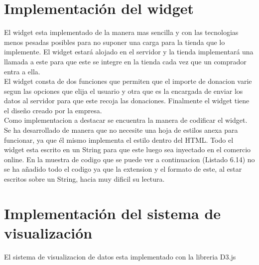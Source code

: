
\section{Implementación del widget}
El widget esta implementado de la manera mas sencilla y con las tecnologias menos pesadas posibles para no suponer una carga para la tienda que lo implemente. El widget estará alojado en el servidor y la tienda implementará una llamada a este para que este se integre en la tienda cada vez que un comprador entra a ella.\\

El widget consta de dos funciones que permiten que el importe de donacion varie segun las opciones que elija el usuario y otra que es la encargada de enviar los datos al servidor para que este recoja las donaciones. Finalmente el widget tiene el diseño creado por la empresa.\\

Como implementacion a destacar se encuentra la manera de codificar el widget. Se ha desarrollado de manera que no necesite una hoja de estilos anexa para funcionar, ya que él mismo implementa el estilo dentro del HTML. Todo el widget esta escrito en un String para que este luego sea inyectado en el comercio online. En la muestra de codigo que se puede ver a continuacion (Listado 6.14) no se ha añadido todo el codigo ya que la extension y el formato de este, al estar escritos sobre un String, hacia muy dificil su lectura.


\section{Implementación del sistema de visualización}
El sistema de visualizacion de datos esta implementado con la libreria D3.js